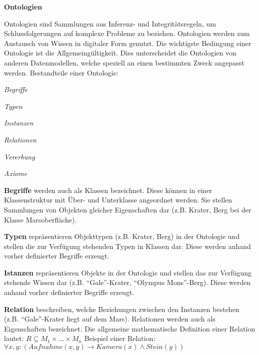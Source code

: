 \textbf{Ontologien}

Ontologien sind Sammlungen aus Inferenz- und Integrit{\"a}tsregeln, um
Schlussfolgerungen auf komplexe Probleme zu beziehen. Ontologien werden zum
Austausch von Wissen in digitaler Form genutzt. Die wichtigste Bedingung einer
Ontologie ist die Allgemeing{\"u}ltigkeit. Dies unterscheidet die Ontologien von
anderen Datenmodellen, welche speziell an einen bestimmten Zweck angepasst
werden. \newline \newline
Bestandteile einer Ontologie:

 \begin{compactenum}[I]
   \item \textit{Begriffe}
   \item \textit{Typen}
   \item \textit{Instanzen}
   \item \textit{Relationen}
   \item \textit{Vererbung}
   \item \textit{Axiome}
 \end{compactenum}
   
 \textbf{Begriffe} werden auch als Klassen bezeichnet. Diese
 k{\"o}nnen in einer Klassenstruktur mit {\"U}ber- und Unterklasse angeordnet
 werden. Sie stellen Sammlungen von Objekten gleicher Eigenschaften dar
 (z.B. Krater, Berg bei der Klasse Marsoberfl{\"a}che).
 
 \textbf{Typen} repr{\"a}sentieren Objekttypen (z.B. Krater, Berg) in
 der Ontologie und stellen die zur Verf{\"u}gung stehenden Typen in Klassen dar.
 Diese werden anhand vorher definierter Begriffe erzeugt.
 
 \textbf{Istanzen} repr{\"a}sentieren Objekte in
 der Ontologie und stellen das zur Verf{\"u}gung stehende Wissen dar
 (z.B. "`Gale"'-Krater, "`Olympus Mons"'-Berg). Diese werden anhand vorher
 definierter Begriffe erzeugt.
 
 \textbf{Relation} beschreiben, welche Beziehungen zwischen den Instanzen
 bestehen (z.B. "`Gale"'-Krater liegt auf dem Mars). Relationen werden auch als
 Eigenschaften bezeichnet.
 \newline
 Die allgemeine mathematische Definition einer Relation lautet:
 \newline    \newline
 $R \subseteq M_1 \times \ldots \times M_n$
 \newline    \newline
 Beispiel einer Relation:
 \newline    \newline
 $\forall x,y : (Aufnahme(x,y) \rightarrow Kamera(x) \wedge Stein(y))$
 
